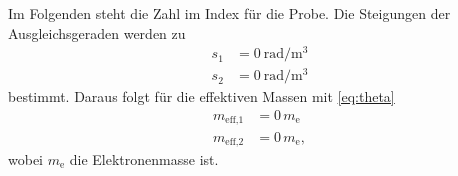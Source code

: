 Im Folgenden steht die Zahl im Index für die Probe. Die Steigungen der Ausgleichsgeraden werden zu
\begin{align*}
    s_1 &= \SI{0}{\radian\per\cubic\meter} \\
    s_2 &= \SI{0}{\radian\per\cubic\meter}
\end{align*}
bestimmt. Daraus folgt für die effektiven Massen mit \ref{eq:theta}
\begin{align*}
    m_\text{eff,1} &= \num{0} \, m_\text{e} \\
    m_\text{eff,2} &= \num{0} \, m_\text{e},
\end{align*}
wobei $m_\text{e}$ die Elektronenmasse ist.